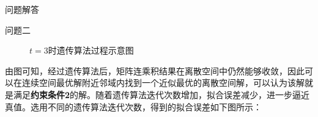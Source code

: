 \documentclass[11pt]{article}
\begin{document}
\begin{section}{问题解答}
\begin{subsection}{问题二}
\begin{figure}[H]
     \label{fig:t=3时遗传算法过程}
     \caption{$t=3$时遗传算法过程示意图}
   \end{figure}
   由图可知，经过遗传算法后，矩阵连乘积结果在离散空间中仍然能够收敛，因此可以在连续空间最优解附近邻域内找到一个近似最优的离散空间解，可以认为该解就是满足\textbf{\songti 约束条件2}的解。随着遗传算法迭代次数增加，拟合误差减少，进一步逼近真值。选用不同的遗传算法迭代次数，得到的拟合误差如下图所示：
   \begin{figure}[H]
     \graphicspath{{./fig/problem_2}}
     \centering

\end{figure}
\end{subsection}
\end{section}
\end{document}
